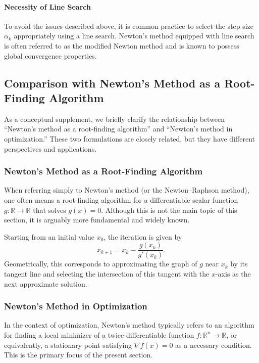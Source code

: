 \documentclass[0_en]{subfiles}
\begin{document}
\paragraph{Necessity of Line Search}

To avoid the issues described above, it is common practice to select the step size $\alpha_k$ appropriately using a line search.
Newton's method equipped with line search is often referred to as the modified Newton method and is known to possess global convergence properties.

\subsection{Comparison with Newton's Method as a Root-Finding Algorithm}

As a conceptual supplement, we briefly clarify the relationship between ``Newton's method as a root-finding algorithm'' and ``Newton's method in optimization.''
These two formulations are closely related, but they have different perspectives and applications.

\subsubsection{Newton's Method as a Root-Finding Algorithm}

When referring simply to Newton's method (or the Newton--Raphson method), one often means a root-finding algorithm for a differentiable scalar function $g\colon \mathbb{R} \to \mathbb{R}$ that solves $g(x) = 0$.
Although this is not the main topic of this section, it is arguably more fundamental and widely known.

Starting from an initial value $x_0$, the iteration is given by
\begin{equation*}
    x_{k+1} = x_k - \frac{g(x_k)}{g'(x_k)}.
\end{equation*}
Geometrically, this corresponds to approximating the graph of $g$ near $x_k$ by its tangent line and selecting the intersection of this tangent with the $x$-axis as the next approximate solution.

\subsubsection{Newton's Method in Optimization}

In the context of optimization, Newton's method typically refers to an algorithm for finding a local minimizer of a twice-differentiable function $f\colon \mathbb R^{n} \to\mathbb{R}$, or equivalently, a stationary point satisfying $\nabla f(x) = 0$ as a necessary condition.
This is the primary focus of the present section.
\end{document}

